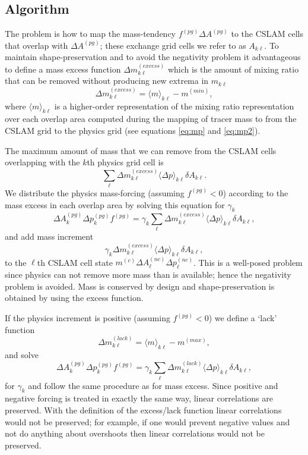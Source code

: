 \subsection{Algorithm}
The problem is how to map the mass-tendency $f^{(pg)}\Delta A^{(pg)}$ to the CSLAM cells that overlap with $\Delta A^{(pg)}$; these exchange grid cells we refer to as $A_{k\ell}$. To maintain shape-preservation and to avoid the negativity problem it advantageous to define a mass excess function $\Delta m_{k\ell}^{(excess)}$ which is the amount of mixing ratio that can be removed without producing new extrema in $m_{k\ell}$
\begin{equation}
\Delta m^{(excess)}_{k\ell}=\langle m\rangle_{k\ell}-m^{(min)},
\end{equation}
where $\langle m\rangle_{k\ell}$ is a higher-order representation of the mixing ratio representation over each overlap area computed during the mapping of tracer mass to from the CSLAM grid to the physics grid (see equations \eqref{eq:mp} and \eqref{eq:mp2}). 

The maximum amount of mass that we can remove from the CSLAM cells overlapping with the $k$th physics grid cell is
\begin{equation}
\sum_\ell \Delta m^{(excess)}_{k\ell}\langle \Delta p\rangle_{k\ell} \delta A_{k\ell}.
\end{equation}
We distribute the physics mass-forcing (assuming $f^{(pg)}<0$) according to the mass excess in each overlap area by solving this equation for $\gamma_k$
\begin{equation}
\Delta A_k^{(pg)}\Delta p_k^{(pg)}f^{(pg)}=\gamma_k \sum_\ell \Delta m^{(excess)}_{k\ell}\langle \Delta p\rangle_{k\ell} \delta A_{k\ell},
\end{equation}
and add mass increment {\color{red}{[check signs!]}}
\begin{equation}
\gamma_k \Delta m^{(excess)}_{k\ell}\langle \Delta p\rangle_{k\ell} \delta A_{k\ell},
\end{equation}
to the $\ell$th CSLAM cell state $m^{(c)}\Delta A^{(nc)}_\ell \Delta p^{(nc)}_\ell$. This is a well-posed problem since physics can not remove more mass than is available; hence the negativity problem is avoided. Mass is conserved by design and shape-preservation is obtained by using the excess function.

If the physics increment is positive (assuming $f^{(pg)}<0$) we define a `lack' function
\begin{equation}
\Delta m^{(lack)}_{k\ell}=\langle m\rangle_{k\ell}-m^{(max)},
\end{equation}
and solve
\begin{equation}
\Delta A_k^{(pg)}\Delta p_k^{(pg)}f^{(pg)}=\gamma_k \sum_\ell \Delta m^{(lack)}_{k\ell}\langle \Delta p\rangle_{k\ell} \delta A_{k\ell},
\end{equation}
for $\gamma_k$ and follow the same procedure as for mass excess. Since positive and negative forcing is treated in exactly the same way, linear correlations are preserved. With the definition of the excess/lack function linear correlations would not be preserved; for example, if one would prevent negative values and not do anything about overshoots then linear correlations would not be preserved.



{\color{red}{mention why the problem is well-posed}}
